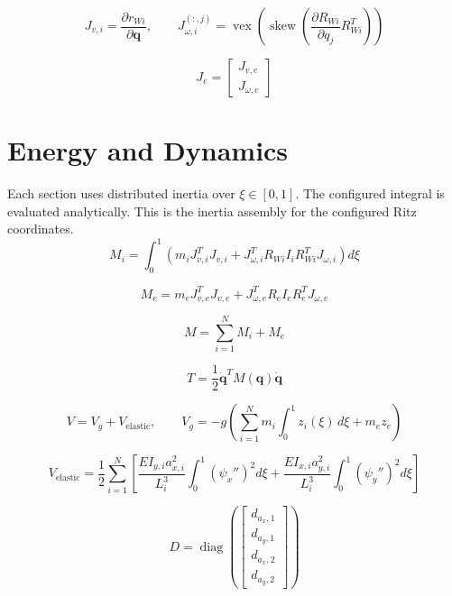 \documentclass[11pt]{article}
\begin{document}
\begin{equation}
J_{v,i}=\frac{\partial r_{Wi}}{\partial\boldsymbol q},\qquad J_{\omega,i}^{(:,j)}=\operatorname{vex}\!\left(\operatorname{skew}\!\left(\frac{\partial R_{Wi}}{\partial q_j}R_{Wi}^{T}\right)\right)
\end{equation}

\begin{equation}
J_e=\begin{bmatrix}J_{v,e}\\J_{\omega,e}\end{bmatrix}
\end{equation}


\section{Energy and Dynamics}
Each section uses distributed inertia over $\xi\in[0,1]$. The configured integral is evaluated analytically. This is the inertia assembly for the configured Ritz coordinates.
\begin{equation}
M_i=\int_0^1\!\left(m_iJ_{v,i}^{T}J_{v,i}+J_{\omega,i}^{T}R_{Wi}I_iR_{Wi}^{T}J_{\omega,i}\right)d\xi
\end{equation}

\begin{equation}
M_e=m_eJ_{v,e}^{T}J_{v,e}+J_{\omega,e}^{T}R_eI_eR_e^TJ_{\omega,e}
\end{equation}

\begin{equation}
M=\sum_{i=1}^{N}M_i+M_e\label{eq:mass-assembly}
\end{equation}

\begin{equation}
T=\frac12\dot{\boldsymbol q}^{T}M(\boldsymbol q)\dot{\boldsymbol q}
\end{equation}

\begin{equation}
V=V_g+V_{\mathrm{elastic}},\qquad V_g=-g\!\left(\sum_{i=1}^{N}m_i\int_0^1z_i(\xi)\,d\xi+m_ez_e\right)
\end{equation}

\begin{equation}
V_{\mathrm{elastic}}=\frac12\sum_{i=1}^{N}\left[\frac{EI_{y,i}a_{x,i}^{2}}{L_i^3}\int_0^1(\psi_x'')^2d\xi+\frac{EI_{x,i}a_{y,i}^{2}}{L_i^3}\int_0^1(\psi_y'')^2d\xi\right]
\end{equation}

\begin{equation}
D=\operatorname{diag}\!\left(\begin{bmatrix}d_{a_x,1}\\d_{a_y,1}\\d_{a_x,2}\\d_{a_y,2}\end{bmatrix}\right)
\end{equation}
\end{document}
